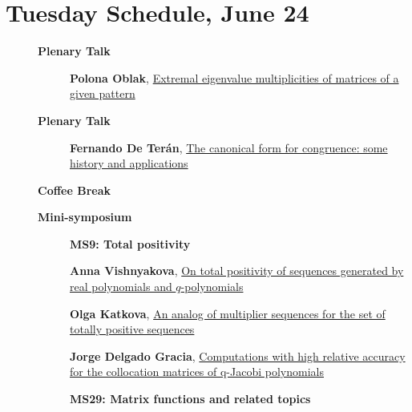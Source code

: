 \documentclass[ILAS2025-program.tex]{subfiles}
\begin{document}
\section{Tuesday Schedule, June 24}
    
    \begin{description}
    \item[] \textbf{Plenary Talk} 
    \begin{description}
        \item[] \hypertarget{up0002}{}\textbf{Polona Oblak}, \hyperlink{down0002}{Extremal eigenvalue multiplicities of matrices of a given pattern
}
        \end{description}
        \item[] \textbf{Plenary Talk} 
    \begin{description}
        \item[] \hypertarget{up0003}{}\textbf{Fernando De Terán}, \hyperlink{down0003}{The canonical form for congruence: some history and applications}
        \end{description}
        \item[] \textbf{Coffee Break} 
    \item[] \textbf{Mini-symposium} 
    \begin{description}
    \item[] {\color{mstitle}\textbf{MS9: Total positivity}} 
    \item[] \hypertarget{up0120}{}\textbf{Anna Vishnyakova}, \hyperlink{down0120}{On total positivity of sequences generated by 
real polynomials and $q$-polynomials
}
        \item[] \hypertarget{up0121}{}\textbf{Olga Katkova}, \hyperlink{down0121}{An analog of multiplier sequences for the set of totally positive sequences}
        \item[] \hypertarget{up0122}{}\textbf{Jorge Delgado Gracia}, \hyperlink{down0122}{Computations with high relative accuracy for the collocation matrices of q-Jacobi polynomials}
        \end{description}
    \begin{description}
    \item[] {\color{mstitle}\textbf{MS29: Matrix functions and related topics}} 

\end{description}
\end{description}
\end{document}
